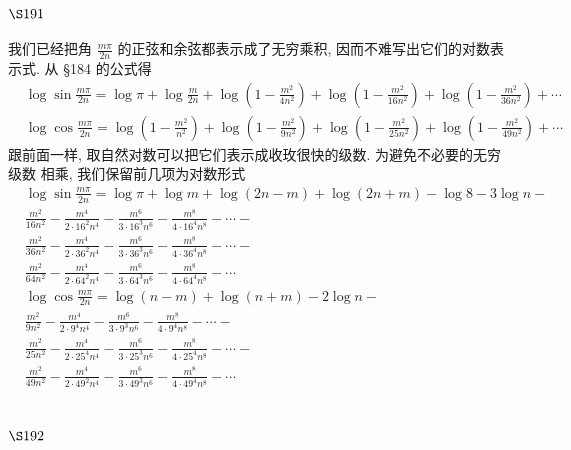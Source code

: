 \section{$\S 191$}

我们已经把角 $\frac{m \pi}{2 n}$ 的正弦和余弦都表示成了无穷乘积, 因而不难写出它们的对数表 示式. 从 §184 的公式得
\[
\begin{aligned}
& \log \sin \frac{m \pi}{2 n}=\log \pi+\log \frac{m}{2 n}+\log \left(1-\frac{m^{2}}{4 n^{2}}\right)+\log \left(1-\frac{m^{2}}{16 n^{2}}\right)+\log \left(1-\frac{m^{2}}{36 n^{2}}\right)+\cdots \\
& \log \cos \frac{m \pi}{2 n}=\log \left(1-\frac{m^{2}}{n^{2}}\right)+\log \left(1-\frac{m^{2}}{9 n^{2}}\right)+\log \left(1-\frac{m^{2}}{25 n^{2}}\right)+\log \left(1-\frac{m^{2}}{49 n^{2}}\right)+\cdots
\end{aligned}
\]
跟前面一样, 取自然对数可以把它们表示成收玫很快的级数. 为避免不必要的无穷级数 相乘, 我们保留前几项为对数形式
\[
\begin{aligned}
& \log \sin \frac{m \pi}{2 n}=\log \pi+\log m+\log (2 n-m)+\log (2 n+m)-\log 8-3 \log n- \\
& \frac{m^{2}}{16 n^{2}}-\frac{m^{4}}{2 \cdot 16^{2} n^{4}}-\frac{m^{6}}{3 \cdot 16^{3} n^{6}}-\frac{m^{8}}{4 \cdot 16^{4} n^{8}}-\cdots- \\
& \frac{m^{2}}{36 n^{2}}-\frac{m^{4}}{2 \cdot 36^{2} n^{4}}-\frac{m^{6}}{3 \cdot 36^{3} n^{6}}-\frac{m^{8}}{4 \cdot 36^{4} n^{8}}-\cdots- \\
& \frac{m^{2}}{64 n^{2}}-\frac{m^{4}}{2 \cdot 64^{2} n^{4}}-\frac{m^{6}}{3 \cdot 64^{3} n^{6}}-\frac{m^{8}}{4 \cdot 64^{4} n^{8}}-\cdots \\
& \log \cos \frac{m \pi}{2 n}=\log (n-m)+\log (n+m)-2 \log n- \\
& \frac{m^{2}}{9 n^{2}}-\frac{m^{4}}{2 \cdot 9^{4} n^{4}}-\frac{m^{6}}{3 \cdot 9^{3} n^{6}}-\frac{m^{8}}{4 \cdot 9^{4} n^{8}}-\cdots- \\
& \frac{m^{2}}{25 n^{2}}-\frac{m^{4}}{2 \cdot 25^{4} n^{4}}-\frac{m^{6}}{3 \cdot 25^{3} n^{6}}-\frac{m^{8}}{4 \cdot 25^{4} n^{8}}-\cdots- \\
& \frac{m^{2}}{49 n^{2}}-\frac{m^{4}}{2 \cdot 49^{2} n^{4}}-\frac{m^{6}}{3 \cdot 49^{3} n^{6}}-\frac{m^{8}}{4 \cdot 49^{4} n^{8}}-\cdots
\end{aligned}
\]
\section{$\S 192$}

